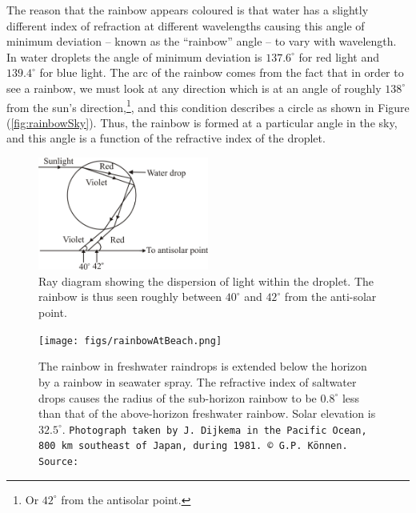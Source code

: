 \begin{refsection}
The reason that the rainbow appears coloured is that water has a slightly different index of refraction at different wavelengths causing this angle of minimum deviation -- known as the ``rainbow'' angle -- to vary with wavelength. In water droplets the angle of minimum deviation is $137.6^\circ$ for red light and $139.4^\circ$ for blue light. The arc of the rainbow comes from the fact that in order to see a rainbow, we must look at any direction which is at an angle of roughly $138^\circ$ from the sun's direction,\footnote{Or $42^\circ$ from the antisolar point.}, and this condition describes a circle as shown in Figure (\ref{fig:rainbowSky}). Thus, the rainbow is formed at a particular angle in the sky, and this angle is a function of the refractive index of the droplet.


\begin{figure}[!htb]
    \centering
    \includegraphics[width=0.5\textwidth]{figs/img1.jpg}
    \caption{Ray diagram showing the dispersion of light within the droplet. The rainbow is thus seen roughly between $40^\circ$ and $42^\circ$ from the anti-solar point.}
    \label{fig:dispersionInDrop}
\end{figure}


\begin{figure}[!htb ]
    \centering
    \texttt{[image: figs/rainbowAtBeach.png]}
    \caption{The rainbow in freshwater raindrops is extended below the horizon by a rainbow in seawater spray. The refractive index of saltwater drops causes the radius of the sub-horizon rainbow to be $0.8^\circ$ less than that of the above-horizon freshwater rainbow. Solar elevation is $32.5^\circ$. \texttt{Photograph taken by J. Dijkema in the Pacific Ocean, 800 km southeast of Japan, during 1981. © G.P. Können. Source:~\cite{konnen_rainbows_2017}}}
    \label{fig:rainbowAtBeach}
\end{figure}



\end{refsection}
